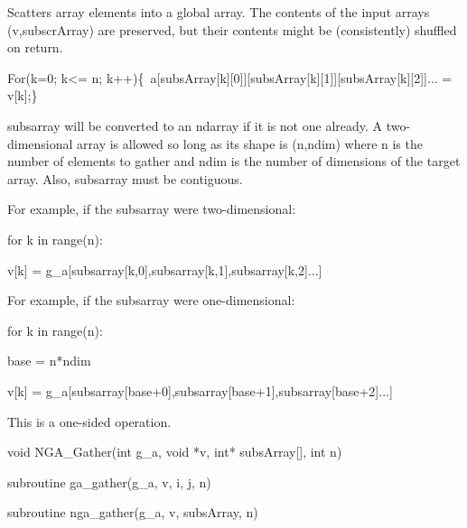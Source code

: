 \documentclass[12pt]{article}
\begin{document}
\begin{desc}

Scatters array elements into a global array. The contents of the input
arrays (v,subscrArray) are preserved, but their contents might be
(consistently) shuffled on return.

For(k=0; k<= n; k++)\{\ a[subsArray[k][0]][subsArray[k][1]][subsArray[k][2]]... = v[k];\}\


subsarray will be converted to an ndarray if it is not one already.
A two-dimensional array is allowed so long as its shape is (n,ndim)
where n is the number of elements to gather and ndim is the number
of dimensions of the target array. Also, subsarray must be contiguous.

For example, if the subsarray were two-dimensional:

for k in range(n):

    v[k] = g_a[subsarray[k,0],subsarray[k,1],subsarray[k,2]...]

For example, if the subsarray were one-dimensional:

for k in range(n):

    base = n*ndim

    v[k] = g_a[subsarray[base+0],subsarray[base+1],subsarray[base+2]...]

This is a one-sided operation.

\end{desc}


\begin{capi}
\begin{ccode}
void NGA_Gather(int g_a, void *v, int* subsArray[], int n)
\end{ccode}
\begin{funcargs}
\end{funcargs}
\end{capi}

\begin{f2dapi}
\begin{fcode}
subroutine ga_gather(g_a, v, i, j, n)
\end{fcode}
\begin{funcargs}
\end{funcargs}
\end{f2dapi}
\begin{fapi}
\begin{fcode}
subroutine nga_gather(g_a, v, subsArray, n)
\end{fcode}
\begin{funcargs}
\end{funcargs}
\end{fapi}
\end{document}
